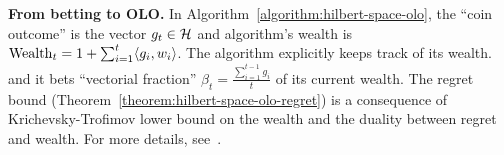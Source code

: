 \textbf{From betting to \ac{OLO}.}
In Algorithm~\ref{algorithm:hilbert-space-olo}, the ``coin outcome'' is the
vector $g_t \in \mathcal{H}$ and algorithm's wealth is $\operatorname{Wealth}_t = 1 + \sum_{i=1}^t
\langle g_i, w_i \rangle$.  The algorithm explicitly keeps track of its wealth.
and it bets ``vectorial fraction'' $\beta_t = \tfrac{\sum_{i=1}^{t-1} g_i}{t}$
of its current wealth. The regret bound
(Theorem~\ref{theorem:hilbert-space-olo-regret}) is a consequence of
Krichevsky-Trofimov lower bound on the wealth and the duality between regret
and wealth.  For more details, see~\cite{Orabona-Pal-2016-parameter-free}.
